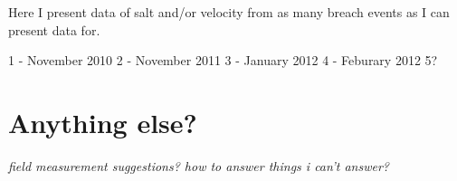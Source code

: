 Here I present data of salt and/or velocity from as many breach events
as I can present data for.

1 - November 2010 2 - November 2011 3 - January 2012 4 - Feburary 2012
5?



\section{Anything else?} \label{backofch2}

\emph{field measurement suggestions? how to answer things i can't
answer?}


